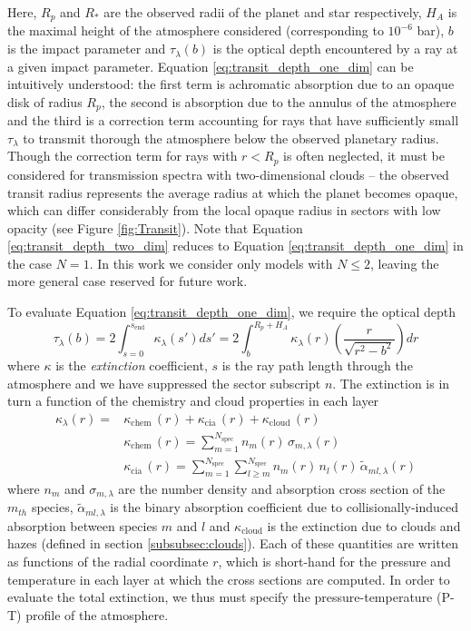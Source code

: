 \documentclass[fleqn,usenatbib]{mnras}
\begin{document}
Here, $R_p$ and $R_*$ are the observed radii of the planet and star respectively, $H_A$ is the maximal height of the atmosphere considered (corresponding to $10^{-6}$ bar), $b$ is the impact parameter and $\tau_{\lambda}(b)$ is the optical depth encountered by a ray at a given impact parameter. Equation \ref{eq:transit_depth_one_dim} can be intuitively understood: the first term is achromatic absorption due to an opaque disk of radius $R_p$, the second is absorption due to the annulus of the atmosphere and the third is a correction term accounting for rays that have sufficiently small $\tau_{\lambda}$ to transmit thorough the atmosphere below the observed planetary radius. Though the correction term for rays with $r<R_p$ is often neglected, it must be considered for transmission spectra with two-dimensional clouds -- the observed transit radius represents the average radius at which the planet becomes opaque, which can differ considerably from the local opaque radius in sectors with low opacity (see Figure \ref{fig:Transit}). Note that Equation \ref{eq:transit_depth_two_dim} reduces to Equation \ref{eq:transit_depth_one_dim} in the case $N=1$. In this work we consider only models with $N \leq 2$, leaving the more general case reserved for future work.

To evaluate Equation \ref{eq:transit_depth_one_dim}, we require the optical depth
%
\begin{equation}
	\tau_{\lambda}(b) = 2\int_{s=0}^{s_{\mathrm{end}}} \kappa_{\lambda}(s') ds' = 2\int_{b}^{R_p + H_A} \kappa_{\lambda}(r) \left(\frac{r}{\sqrt{r^2 - b^2}}\right) dr
\label{eq:tau}
\end{equation}
%
where $\kappa$ is the \emph{extinction} coefficient, $s$ is the ray path length through the atmosphere and we have suppressed the sector subscript $n$. The extinction is in turn a function of the chemistry and cloud properties in each layer
%
\begin{equation}
\begin{split}
	\kappa_{\lambda}(r) = & \kappa_{\mathrm{chem}}\, (r) + \kappa_{\mathrm{cia}}\, (r) + \kappa_{\mathrm{cloud}}\, (r) \\
	& \kappa_{\mathrm{\mathrm{chem}}}\, (r) = \sum_{m=1}^{N_{\mathrm{spec}}} n_{m}(r) \, \sigma_{m, \lambda}(r) \\
    & \kappa_{\mathrm{\mathrm{cia}}}\, (r) = \sum_{m=1}^{N_{\mathrm{spec}}} \sum_{l \geq m}^{N_{\mathrm{spec}}} n_{m}(r) \, n_{l}(r) \, \tilde{\alpha}_{ml, \lambda}(r) 
\label{eq:extinction}
\end{split}
\end{equation}
%
where $n_m$ and $\sigma_{m, \lambda}$ are the number density and absorption cross section of the $m_{th}$ species, $\tilde{\alpha}_{ml, \lambda}$ is the binary absorption coefficient due to collisionally-induced absorption between species $m$ and $l$ and $\kappa_{\mathrm{cloud}}$ is the extinction due to clouds and hazes (defined in section \ref{subsubsec:clouds}). Each of these quantities are written as functions of the radial coordinate $r$, which is short-hand for the pressure and temperature in each layer at which the cross sections are computed. In order to evaluate the total extinction, we thus must specify the pressure-temperature (P-T) profile of the atmosphere.
\end{document}
